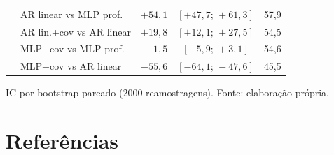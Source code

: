 \documentclass[12pt,a4paper,oneside]{article}
\newcounter{mref}
\begin{document}
\begin{table}[H]
\begin{tabular}{@{}clrcr@{}}
 & AR linear vs MLP prof. & $+54{,}1$ & $[+47{,}7;\,+61{,}3]$ & 57,9 \\
 & AR lin.+cov vs AR linear & $+19{,}8$ & $[+12{,}1;\,+27{,}5]$ & 54,5 \\
 & MLP+cov vs MLP prof. & $-1{,}5$ & $[-5{,}9;\,+3{,}1]$ & 54,6 \\
 & MLP+cov vs AR linear & $-55{,}6$ & $[-64{,}1;\,-47{,}6]$ & 45,5 \\
\bottomrule
\end{tabular}
\par\smallskip
{\footnotesize IC por bootstrap pareado (\num{2000} reamostragens). Fonte:
elaboração própria.}
\end{table}

\newpage
\section*{Referências}
\setcounter{mref}{0}
\end{document}
